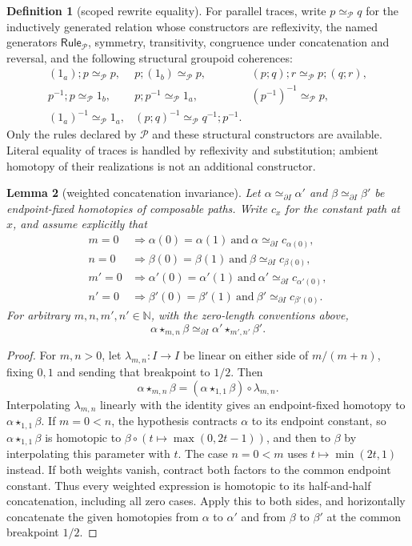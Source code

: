 \documentclass[10pt,reqno]{amsart}
\theoremstyle{definition}
\newtheorem{definition}{Definition}[section]
\theoremstyle{plain}
\newtheorem{lemma}[definition]{Lemma}
\theoremstyle{remark}
\newcommand{\RwEq}{\mathrel{\simeq_{\!\mathcal P}}}
\newcommand{\N}{\mathbb N}
\begin{document}
\begin{definition}[scoped rewrite equality]\label{def:scoped-rewrite-equality}
For parallel traces, write $p\RwEq q$ for the inductively generated relation
whose constructors are reflexivity, the named generators $\mathsf{Rule}_{\mathcal P}$,
symmetry, transitivity, congruence under concatenation and reversal, and the
following structural groupoid coherences:
\[
\begin{array}{lll}
(1_a);p\RwEq p, & p;(1_b)\RwEq p, & (p;q);r\RwEq p;(q;r),\\
p^{-1};p\RwEq 1_b, & p;p^{-1}\RwEq 1_a, & (p^{-1})^{-1}\RwEq p,\\
(1_a)^{-1}\RwEq 1_a, & (p;q)^{-1}\RwEq q^{-1};p^{-1}. &
\end{array}
\]
Only the rules declared by $\mathcal P$ and these structural constructors are
available.  Literal equality of traces is handled by reflexivity and
substitution; ambient homotopy of their realizations is not an additional
constructor.
\end{definition}

\begin{lemma}[weighted concatenation invariance]
\label{lem:weighted-concat-invariance}
Let $\alpha\simeq_{\partial I}\alpha'$ and
$\beta\simeq_{\partial I}\beta'$ be endpoint-fixed homotopies of composable
paths.  Write $c_x$ for the constant path at $x$, and assume explicitly that
\[
\begin{aligned}
m=0&\Rightarrow \alpha(0)=\alpha(1)\ \text{and}\ \alpha\simeq_{\partial I}c_{\alpha(0)},\\
n=0&\Rightarrow \beta(0)=\beta(1)\ \text{and}\ \beta\simeq_{\partial I}c_{\beta(0)},\\
m'=0&\Rightarrow \alpha'(0)=\alpha'(1)\ \text{and}\ \alpha'\simeq_{\partial I}c_{\alpha'(0)},\\
n'=0&\Rightarrow \beta'(0)=\beta'(1)\ \text{and}\ \beta'\simeq_{\partial I}c_{\beta'(0)}.
\end{aligned}
\]
For arbitrary
$m,n,m',n'\in\N$, with the zero-length conventions above,
\[
  \alpha\star_{m,n}\beta
  \simeq_{\partial I}
  \alpha'\star_{m',n'}\beta'.
\]
\end{lemma}

\begin{proof}
For $m,n>0$, let $\lambda_{m,n}:I\to I$ be linear on either side of
$m/(m+n)$, fixing $0,1$ and sending that breakpoint to $1/2$. Then
\[
 \alpha\star_{m,n}\beta
   =(\alpha\star_{1,1}\beta)\circ\lambda_{m,n}.
\]
Interpolating $\lambda_{m,n}$ linearly with the identity gives an
endpoint-fixed homotopy to $\alpha\star_{1,1}\beta$.
If $m=0<n$, the hypothesis contracts $\alpha$ to its endpoint constant,
so $\alpha\star_{1,1}\beta$ is homotopic to
$\beta\circ(t\mapsto\max(0,2t-1))$, and then to $\beta$ by interpolating
this parameter with $t$. The case $n=0<m$ uses
$t\mapsto\min(2t,1)$ instead. If both weights vanish, contract both
factors to the common endpoint constant. Thus every weighted expression
is homotopic to its half-and-half concatenation, including all zero cases.
Apply this to both sides, and horizontally concatenate the given
homotopies from $\alpha$ to $\alpha'$ and from $\beta$ to $\beta'$ at
the common breakpoint $1/2$.
\end{proof}
\end{document}
